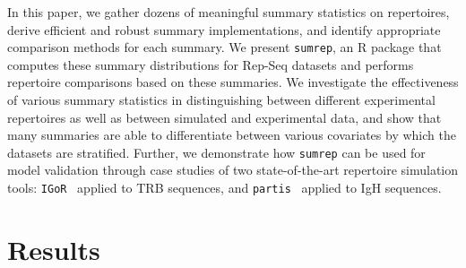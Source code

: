 \documentclass{article}
\newcommand{\partis}{\texttt{partis}}
\newcommand{\igor}{\texttt{IGoR}}
\begin{document}
In this paper, we gather dozens of meaningful summary statistics on repertoires, derive efficient and robust summary implementations, and identify appropriate comparison methods for each summary.
We present \texttt{sumrep}, an R package that computes these summary distributions for Rep-Seq datasets and performs repertoire comparisons based on these summaries.
We investigate the effectiveness of various summary statistics in distinguishing between different experimental repertoires as well as between simulated and experimental data, and show that many summaries are able to differentiate between various covariates by which the datasets are stratified.
Further, we demonstrate how \texttt{sumrep} can be used for model validation through case studies of two state-of-the-art repertoire simulation tools: \igor~\cite{Marcou2018-du} applied to TRB sequences, and \partis~\cite{Ralph2016-nw, Ralph2016-iz} applied to IgH sequences.


\section*{Results}
\end{document}

